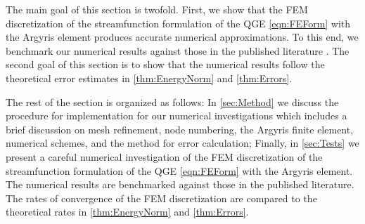 The main goal of this section is twofold. First, we show that the FEM discretization of the
streamfunction formulation of the QGE \eqref{eqn:FEForm} with the Argyris element produces accurate
numerical approximations. To this end, we benchmark our numerical results against those in the
published literature \cite{Vallis06,Cascon,Myers}. The second goal of this section is to show that
the numerical results follow the theoretical error estimates in \autoref{thm:EnergyNorm} and
\autoref{thm:Errors}.

The rest of the section is organized as follows: In \autoref{sec:Method} we discuss the procedure
for implementation for our numerical investigations which includes a brief discussion on mesh
refinement, node numbering, the Argyris finite element, numerical schemes, and the method for error
calculation; Finally, in \autoref{sec:Tests} we present a careful numerical investigation of the FEM
discretization of the streamfunction formulation of the QGE \eqref{eqn:FEForm} with the Argyris
element. The numerical results are benchmarked against those in the published literature. The rates
of convergence of the FEM discretization are compared to the theoretical rates in
\autoref{thm:EnergyNorm} and \autoref{thm:Errors}.

